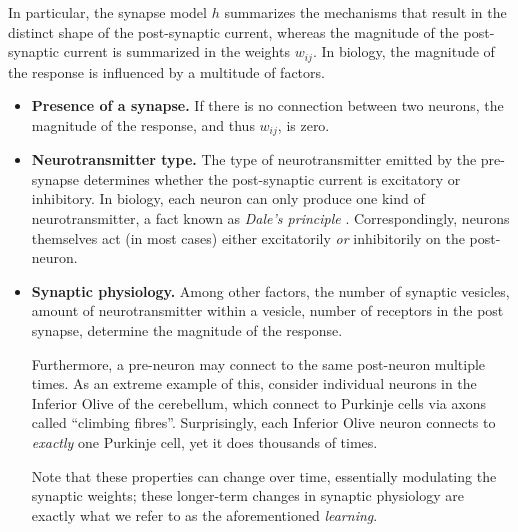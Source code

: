 \documentclass[10pt,letterpaper,oneside]{article}
\begin{document}
	In particular, the synapse model $h$ summarizes the mechanisms that result in the distinct shape of the post-synaptic current, whereas the magnitude of the post-synaptic current is summarized in the weights $w_{ij}$. In biology, the magnitude of the response is influenced by a multitude of factors.
	\begin{itemize}
		\item \textbf{Presence of a synapse.}
		      If there is no connection between two neurons, the magnitude of the response, and thus $w_{ij}$, is zero.
		\item \textbf{Neurotransmitter type.}
		      The type of neurotransmitter emitted by the pre-synapse determines whether the post-synaptic current is excitatory or inhibitory. In biology, each neuron can only produce one kind of neurotransmitter, a fact known as \emph{Dale's principle} \cite{strata1999dale}. Correspondingly, neurons themselves act (in most cases) either excitatorily \emph{or} inhibitorily on the post-neuron.
		\item \textbf{Synaptic physiology.}
		      Among other factors, the number of synaptic vesicles, amount of neurotransmitter within a vesicle, number of receptors in the post synapse, determine the magnitude of the response.
		      
		      Furthermore, a pre-neuron may connect to the same post-neuron multiple times. As an extreme example of this, consider individual neurons in the Inferior Olive of the cerebellum, which connect to Purkinje cells via axons called \enquote{climbing fibres}. Surprisingly, each Inferior Olive neuron connects to \emph{exactly} one Purkinje cell, yet it does thousands of times.

		      Note that these properties can change over time, essentially modulating the synaptic weights; these longer-term changes in synaptic physiology are exactly what we refer to as the aforementioned \emph{learning}.
	\end{itemize}
	
\end{document}
